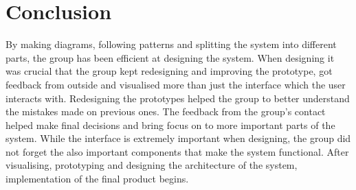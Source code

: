 \chapter{Conclusion}

By making diagrams, following patterns and splitting the system into different parts, the group has been efficient at designing the system.
When designing it was crucial that the group kept redesigning and improving the prototype, got feedback from outside and visualised more than just the interface which the user interacts with.
Redesigning the prototypes helped the group to better understand the mistakes made on previous ones.
The feedback from the group's contact helped make final decisions and bring focus on to more important parts of the system.
While the interface is extremely important when designing, the group did not forget the also important components that make the system functional.
After visualising, prototyping and designing the architecture of the system, implementation of the final product begins.
